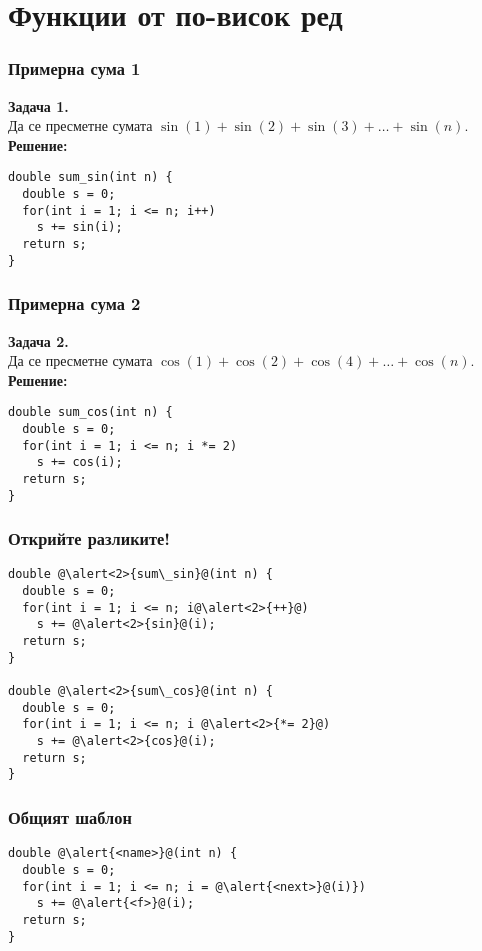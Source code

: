 \documentclass{beamer}
\begin{document}
\section{Функции от по-висок ред}

\begin{frame}[fragile]
  \frametitle{Примерна сума 1}

  \textbf{Задача 1.}\\
  Да се пресметне сумата $\sin(1) + \sin(2) + \sin(3) + \ldots + \sin(n)$.\\[1em]
  \pause
  \textbf{Решение:}
\begin{lstlisting}
double sum_sin(int n) {
  double s = 0;
  for(int i = 1; i <= n; i++)
    s += sin(i);
  return s;
}
\end{lstlisting}
\end{frame}

\begin{frame}[fragile]
  \frametitle{Примерна сума 2}

  \textbf{Задача 2.}\\
  Да се пресметне сумата $\cos(1) + \cos(2) + \cos(4) + \ldots + \cos(n)$.\\[1em]
  \pause
  \textbf{Решение:}
\begin{lstlisting}
double sum_cos(int n) {
  double s = 0;
  for(int i = 1; i <= n; i *= 2)
    s += cos(i);
  return s;
}
\end{lstlisting}
\end{frame}

\begin{frame}[fragile]
  \frametitle{Открийте разликите!}

\begin{lstlisting}
double @\alert<2>{sum\_sin}@(int n) {
  double s = 0;
  for(int i = 1; i <= n; i@\alert<2>{++}@)
    s += @\alert<2>{sin}@(i);
  return s;
}

double @\alert<2>{sum\_cos}@(int n) {
  double s = 0;
  for(int i = 1; i <= n; i @\alert<2>{*= 2}@)
    s += @\alert<2>{cos}@(i);
  return s;
}
\end{lstlisting}
\end{frame}

\begin{frame}[fragile]
  \frametitle{Общият шаблон}

\begin{lstlisting}
double @\alert{<name>}@(int n) {
  double s = 0;
  for(int i = 1; i <= n; i = @\alert{<next>}@(i)})
    s += @\alert{<f>}@(i);
  return s;
}
\end{lstlisting}
\end{frame}
\end{document}
